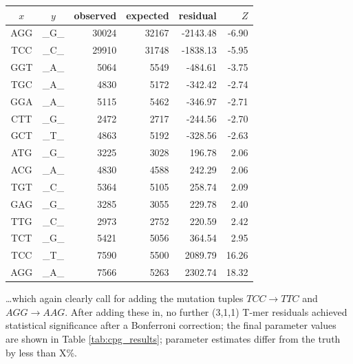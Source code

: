 \documentclass{article}
\newcommand{\nA}{\mbox{A}}  %
\newcommand{\nC}{\mbox{C}}
\newcommand{\nG}{\mbox{G}}
\newcommand{\nT}{\mbox{T}}
\theoremstyle{plain}
\theoremstyle{definition}
\begin{document}
    \begin{center}
        \begin{tabular}{ccrrrr}
                $x$ & $y$ & observed &   expected &    residual &  $Z$ \\
                \hline
                \nA\nG\nG  &  \_\nG\_  &  30024  &  32167  &  -2143.48  &  -6.90 \\
                \nT\nC\nC  &  \_\nC\_  &  29910  &  31748  &  -1838.13  &  -5.95 \\
                \nG\nG\nT  &  \_\nA\_  &   5064  &   5549  &   -484.61  &  -3.75 \\
                \nT\nG\nC  &  \_\nA\_  &   4830  &   5172  &   -342.42  &  -2.74 \\
                \nG\nG\nA  &  \_\nA\_  &   5115  &   5462  &   -346.97  &  -2.71 \\
                \nC\nT\nT  &  \_\nG\_  &   2472  &   2717  &   -244.56  &  -2.70 \\
                \nG\nC\nT  &  \_\nT\_  &   4863  &   5192  &   -328.56  &  -2.63 \\
                \hline
                \nA\nT\nG  &  \_\nG\_  &   3225  &   3028  &    196.78  &   2.06  \\
                \nA\nC\nG  &  \_\nA\_  &   4830  &   4588  &    242.29  &   2.06  \\
                \nT\nG\nT  &  \_\nC\_  &   5364  &   5105  &    258.74  &   2.09  \\
                \nG\nA\nG  &  \_\nG\_  &   3285  &   3055  &    229.78  &   2.40  \\
                \nT\nT\nG  &  \_\nC\_  &   2973  &   2752  &    220.59  &   2.42  \\
                \nT\nC\nT  &  \_\nG\_  &   5421  &   5056  &    364.54  &   2.95  \\
                \nT\nC\nC  &  \_\nT\_  &   7590  &   5500  &   2089.79  &  16.26  \\
                \nA\nG\nG  &  \_\nA\_  &   7566  &   5263  &   2302.74  &  18.32  \\
                \hline                                                     
        \end{tabular}
    \end{center}
\ldots which again clearly call for adding the mutation tuples $TCC \to TTC$ and $AGG \to AAG$.
After adding these in, 
no further (3,1,1) T-mer residuals achieved
statistical significance after a Bonferroni correction;
the final parameter values are shown in Table \ref{tab:cpg_results};
parameter estimates differ from the truth by less than X\%.
\end{document}
